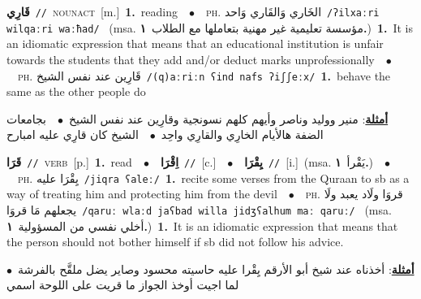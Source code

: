 \documentclass[10pt,a4paper,twoside]{article} %
\begin{document}
\begin{multicols}{2}
{\setlength\topsep{0pt}\textbf{\foreignlanguage{arabic}{قَارِي}}\ {\color{gray}\texttt{//}\color{black}}\ \textsc{noun\textunderscore act}\ [m.]\ \textbf{1.}~reading\ \ $\bullet$\ \ \textsc{ph.} \color{gray} \foreignlanguage{arabic}{الخَاري وَالقَاري وَاحد}\color{black}\ {\color{gray}\texttt{/{\sffamily ʔilxaːri wilqaːri waːħad}/}\color{black}}\ \color{gray} (msa. \foreignlanguage{arabic}{مؤسسة تعليمية غير مهنية بتعاملها مع الطلاب}~\foreignlanguage{arabic}{\textbf{١.}})\color{black}\ \textbf{1.}~It is an idiomatic expression that means that an educational institution is unfair towards the students that they add and/or deduct marks unprofessionally\ \ $\bullet$\ \ \textsc{ph.} \color{gray} \foreignlanguage{arabic}{قَارِين عند نفس الشيخ}\color{black}\ {\color{gray}\texttt{/{\sffamily (q)aːriːn ʕind nafs ʔiʃʃeːx}/}\color{black}}\ \textbf{1.}~behave the same as the other people do\  \begin{flushright}\color{gray}\foreignlanguage{arabic}{\textbf{\underline{\foreignlanguage{arabic}{أمثلة}}}: منير ووليد وناصر وأيهم كلهم نسونجية وقارِين عند نفس الشيخ\ $\bullet$\ \  بجامعات الضفة هالأيام الخارِي والقارِي واحِد\ $\bullet$\ \  الشيخ كان قارِي عليه امبارح}\end{flushright}\color{black}} \vspace{2mm}

{\setlength\topsep{0pt}\textbf{\foreignlanguage{arabic}{قَرَا}}\ {\color{gray}\texttt{//}\color{black}}\ \textsc{verb}\ [p.]\ \textbf{1.}~read\ \ $\bullet$\ \ \setlength\topsep{0pt}\textbf{\foreignlanguage{arabic}{اِقْرَا}}\ {\color{gray}\texttt{//}\color{black}}\ [c.]\ \ $\bullet$\ \ \setlength\topsep{0pt}\textbf{\foreignlanguage{arabic}{يِقْرَا}}\ {\color{gray}\texttt{//}\color{black}}\ [i.]\ \color{gray}(msa. \foreignlanguage{arabic}{يَقْرأ}~\foreignlanguage{arabic}{\textbf{١.}})\color{black}\ \ $\bullet$\ \ \textsc{ph.} \color{gray} \foreignlanguage{arabic}{يِقْرَا عليه}\color{black}\ {\color{gray}\texttt{/{\sffamily jiqra ʕaleː}/}\color{black}}\ \textbf{1.}~recite some verses from the Quraan to sb as a way of treating him and protecting him from the devil\ \ $\bullet$\ \ \textsc{ph.} \color{gray} \foreignlanguage{arabic}{قروَا ولَاد يعبد ولَا يجعلهم مَا قروَا}\color{black}\ {\color{gray}\texttt{/{\sffamily qaruː wlaːd jaʕbad willa jidʒʕalhum maː qaruː}/}\color{black}}\ \color{gray} (msa. \foreignlanguage{arabic}{أخلي نفسي من المسؤولية}~\foreignlanguage{arabic}{\textbf{١.}})\color{black}\ \textbf{1.}~It is an idiomatic expression that means that the person should not bother himself if sb did not follow his advice.\  \begin{flushright}\color{gray}\foreignlanguage{arabic}{\textbf{\underline{\foreignlanguage{arabic}{أمثلة}}}: أخذناه عند شيخ أبو الأرقم يِقْرا عليه حاسيته محسود وصاير يضل ملقَّح بالفرشة\ $\bullet$\ \  لما اجيت أوخذ الجواز ما قريت على اللوحة اسمي}\end{flushright}\color{black}} \vspace{2mm}


\end{multicols}
\end{document}
